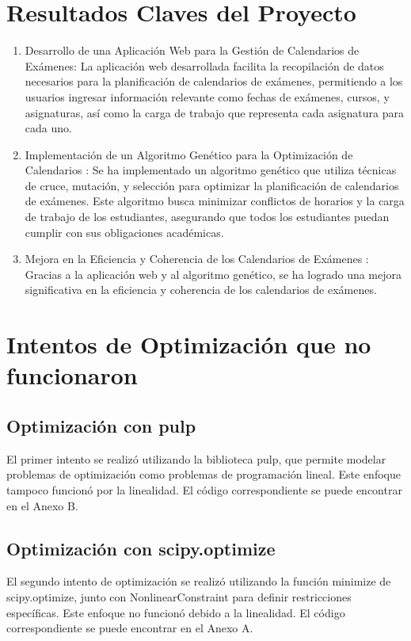 \documentclass{article}
\begin{document}
\section{Resultados Claves del Proyecto}
\begin{enumerate}
\item{Desarrollo de una Aplicación Web para la Gestión de Calendarios de Exámenes: }
La aplicación web desarrollada facilita la recopilación de datos necesarios para la planificación de calendarios de exámenes, permitiendo a los usuarios ingresar información relevante como fechas de exámenes, cursos, y asignaturas, así como la carga de trabajo que representa cada asignatura para cada uno.

\item{Implementación de un Algoritmo Genético para la Optimización de Calendarios :}
Se ha implementado un algoritmo genético que utiliza técnicas de cruce, mutación, y selección para optimizar la planificación de calendarios de exámenes. Este algoritmo busca minimizar conflictos de horarios y la carga de trabajo de los estudiantes, asegurando que todos los estudiantes puedan cumplir con sus obligaciones académicas.

\item{Mejora en la Eficiencia y Coherencia de los Calendarios de Exámenes :}
Gracias a la aplicación web y al algoritmo genético, se ha logrado una mejora significativa en la eficiencia y coherencia de los calendarios de exámenes.


\end{enumerate}

\section{Intentos de Optimización que no funcionaron}

\subsection{Optimización con pulp}
El primer intento se realizó utilizando la biblioteca pulp, que permite modelar problemas de optimización como problemas de programación lineal. Este enfoque tampoco funcionó por la linealidad. El código correspondiente se puede encontrar en el Anexo B.

\subsection{Optimización con scipy.optimize}
El segundo intento de optimización se realizó utilizando la función minimize de scipy.optimize, junto con NonlinearConstraint para definir restricciones específicas. Este enfoque no funcionó debido a la linealidad. El código correspondiente se puede encontrar en el Anexo A.
\end{document}
